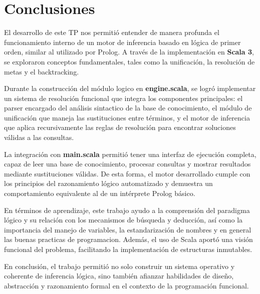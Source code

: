 \section{Conclusiones}

El desarrollo de este TP nos permitió entender de manera profunda el funcionamiento interno de un motor de inferencia basado en lógica de primer orden, similar al utilizado por Prolog. A través de la implementación en \textbf{Scala 3}, se exploraron conceptos fundamentales, tales como la unificación, la resolución de metas y el backtracking.

Durante la construcción del módulo logico en \textbf{engine.scala}, se logró implementar un sistema de resolución funcional que integra los componentes principales: el parser encargado del análisis sintactico de la base de conocimiento, el módulo de unificación que maneja las sustituciones entre términos, y el motor de inferencia que aplica recursivamente las reglas de resolución para encontrar soluciones válidas a las consultas.

La integración con \textbf{main.scala} permitió tener una interfaz de ejecución completa, capaz de leer una base de conocimiento, procesar consultas y mostrar resultados mediante sustituciones válidas. De esta forma, el motor desarrollado cumple con los principios del razonamiento lógico automatizado y demuestra un comportamiento equivalente al de un intérprete Prolog básico.

En términos de aprendizaje, este trabajo ayudo a la comprensión del paradigma lógico y su relación con los mecanismos de búsqueda y deducción, así como la importancia del manejo de variables, la estandarización de nombres y en general las buenas practicas de programacion. Además, el uso de Scala aportó una visión funcional del problema, facilitando la implementación de estructuras inmutables.

En conclusión, el trabajo permitió no solo construir un sistema operativo y coherente de inferencia lógica, sino también afianzar habilidades de diseño, abstracción y razonamiento formal en el contexto de la programación funcional.